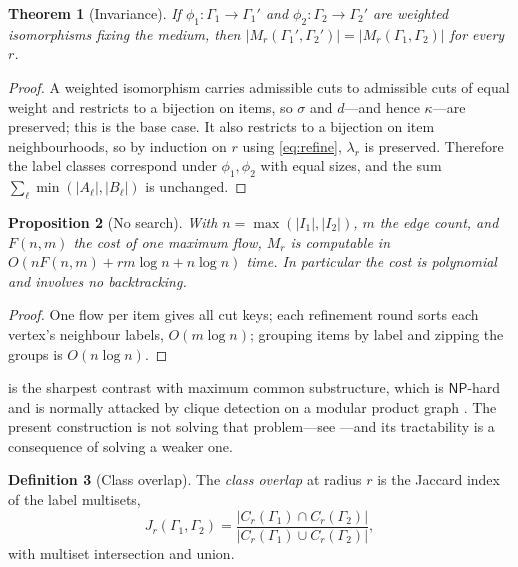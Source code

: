 \documentclass[11pt,twocolumn,a4paper]{article}
\theoremstyle{scthm}
\newtheorem{theorem}{Theorem}[section]
\newtheorem{proposition}[theorem]{Proposition}
\theoremstyle{definition}
\newtheorem{definition}[theorem]{Definition}
\theoremstyle{remark}
\newcommand{\Gph}{\Gamma}
\newcommand{\sep}{\sigma}
\newcommand{\dep}{d}
\newcommand{\key}{\kappa}
\newcommand{\lab}{\lambda}
\newcommand{\abs}[1]{\lvert#1\rvert}
\begin{document}
\begin{theorem}[Invariance]
\label{thm:invariance}
If $\phi_1\colon\Gph_1\to\Gph_1'$ and $\phi_2\colon\Gph_2\to\Gph_2'$ are
weighted isomorphisms fixing the medium, then
$\abs{M_r(\Gph_1',\Gph_2')}=\abs{M_r(\Gph_1,\Gph_2)}$ for every $r$.
\end{theorem}

\begin{proof}
A weighted isomorphism carries admissible cuts to admissible cuts of equal
weight and restricts to a bijection on items, so $\sep$ and $\dep$---and
hence $\key$---are preserved; this is the base case. It also restricts to
a bijection on item neighbourhoods, so by induction on $r$ using
\eqref{eq:refine}, $\lab_r$ is preserved. Therefore the label classes
correspond under $\phi_1,\phi_2$ with equal sizes, and the sum
$\sum_\ell\min(\abs{A_\ell},\abs{B_\ell})$ is unchanged.
\end{proof}

\begin{proposition}[No search]
\label{prop:cost}
With $n=\max(\abs{I_1},\abs{I_2})$, $m$ the edge count, and $F(n,m)$ the
cost of one maximum flow, $M_r$ is computable in
$O(nF(n,m)+rm\log n+n\log n)$ time. In particular the cost is polynomial
and involves no backtracking.
\end{proposition}

\begin{proof}
One flow per item gives all cut keys; each refinement round sorts each
vertex's neighbour labels, $O(m\log n)$; grouping items by label and
zipping the groups is $O(n\log n)$.
\end{proof}

 is the sharpest contrast with maximum common
substructure, which is $\mathsf{NP}$-hard
\citep{garey1979,raymond2002,ehrlich2011} and is normally attacked by
clique detection on a modular product graph
\citep{barrow1976,bron1973,raymond2002rascal}. The present construction is
not solving that problem---see ---and its tractability is
a consequence of solving a weaker one.

\begin{definition}[Class overlap]
\label{def:overlap}
The \emph{class overlap} at radius $r$ is the Jaccard index of the label
multisets,
\[
J_r(\Gph_1,\Gph_2)=
\frac{\abs{C_r(\Gph_1)\cap C_r(\Gph_2)}}
     {\abs{C_r(\Gph_1)\cup C_r(\Gph_2)}},
\]
with multiset intersection and union.
\end{definition}
\end{document}
